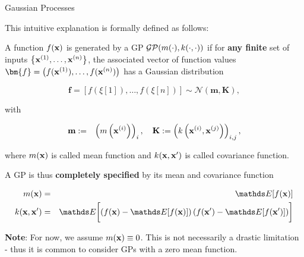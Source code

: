 \documentclass[11pt,compress,t,notes=noshow, xcolor=table]{beamer}
\begin{document}
\begin{vbframe}{Gaussian Processes}

This intuitive explanation is formally defined as follows: 

\lz 

A function $f(\mathbf{x})$ is generated by a GP $\mathcal{GP}(m(\cdot), k(\cdot, \cdot))$ if for \textbf{any finite} set of inputs $\left\{\mathbf{x}^{(1)}, \dots, \mathbf{x}^{(n)}\right\}$, the associated vector of function values $\bm{f} = \left(f(\xv^{(1)}), \dots, f(\xv^{(n)})\right)$ has a Gaussian distribution

$$
\bm{f} = \left[f\left(\xi[1]\right),\dots, f\left(\xi[n]\right)\right] \sim \mathcal{N}\left(\bm{m}, \bm{K}\right),
$$

with 


\begin{eqnarray*}
\textbf{m} &:=& \left(m\left(\mathbf{x}^{(i)}\right)\right)_{i}, \quad
\textbf{K} := \left(k\left(\mathbf{x}^{(i)}, \mathbf{x}^{(j)}\right)\right)_{i,j}, 
\end{eqnarray*}
 
where $m(\mathbf{x})$ is called mean function and $k(\mathbf{x}, \mathbf{x}^\prime)$ is called covariance function. 


\framebreak 

\vspace*{0.5cm} 

A GP is thus \textbf{completely specified} by its mean and covariance function

\vspace*{-0.2cm}
\begin{eqnarray*}
m(\xv) &=& \E[f(\xv)] \\
k(\xv, \xv^\prime) &=& \E\biggl[\left( f(\xv) - \E[f(\xv)] \right) \left( f(\xv^\prime) - \E[f(\xv^\prime)] \right)\biggr]
\end{eqnarray*}

\vfill

\textbf{Note}: For now, we assume $m(\mathbf{x}) \equiv 0$. This is not necessarily a drastic limitation - thus it is common to consider GPs with a zero mean function. 








\end{vbframe}
\end{document}
